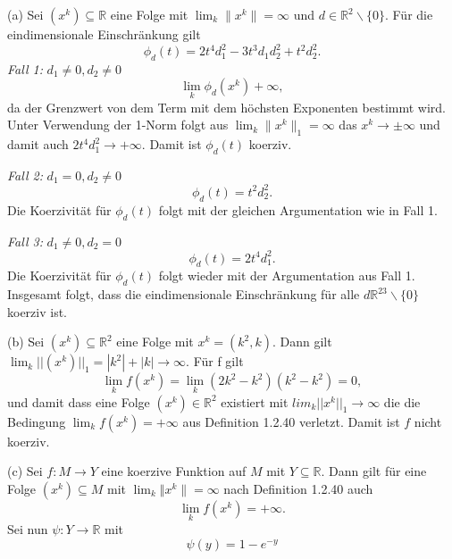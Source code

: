 \documentclass[ngerman, a4paper,12pt]{article}
\begin{document}
(a) Sei $(x^k) \subseteq \mathbb{R}$ eine Folge mit $\lim_k \| x^k \| = \infty$ und $d \in \mathbb{R}^2 \backslash \{0\}$. Für die eindimensionale Einschränkung gilt 
\begin{equation*}
	\phi_d(t) = 2t^4d_1^2 - 3t^3d_1d_2^2 + t^2 d_2^2.
\end{equation*}
\textit{Fall 1:} $d_1 \neq 0, d_2 \neq 0$
\begin{equation}
	\lim\limits_{k} \phi_d(x^k) + \infty,
\end{equation}
da der Grenzwert von dem Term mit dem höchsten Exponenten bestimmt wird. Unter Verwendung der 1-Norm folgt aus $\lim_k \| x^k \|_1 = \infty$ das $x^k \rightarrow \pm \infty$ und damit auch $2t^4d_1^2 \rightarrow + \infty$. Damit ist $\phi_d(t)$ koerziv. \par
\textit{Fall 2:} $d_1 = 0, d_2 \neq 0$
\begin{equation}
	\phi_d(t) = t^2d_2^2.
\end{equation}
Die Koerzivität für $\phi_d(t)$ folgt mit der gleichen Argumentation wie in Fall 1. \par
\textit{Fall 3:} $d_1 \neq 0, d_2 = 0$
\begin{equation}
	\phi_d(t) = 2t^4d_1^2.
\end{equation}
Die Koerzivität für $\phi_d(t)$ folgt wieder mit der Argumentation aus Fall 1. Insgesamt folgt, dass die eindimensionale Einschränkung für alle $d \mathbb{R}^23 \backslash \{0\}$ koerziv ist.
\par
(b) Sei $(x^k) \subseteq \mathbb{R}^2$ eine Folge mit $x^k = (k^2, k)$. Dann gilt $\lim_k ||(x^k)||_1 = |k^2|+|k| \rightarrow \infty$. Für f gilt
\begin{equation}
	\lim\limits_{k} f(x^k) = \lim\limits_{k} (2k^2-k^2)(k^2-k^2) = 0,
\end{equation}
und damit dass eine Folge $(x^k) \in \mathbb{R}^2$ existiert mit $lim_k ||x^k||_1 \rightarrow \infty$ die die Bedingung $\lim_k f(x^k) = + \infty$ aus Definition 1.2.40 verletzt. Damit ist $f$ nicht koerziv. \par
(c) Sei $f: M \rightarrow Y$ eine koerzive Funktion auf $M$ mit $Y \subseteq \mathbb{R}$. Dann gilt für eine Folge $(x^k) \subseteq M$ mit $\lim_{k} \Vert x^k \| = \infty$ nach Definition 1.2.40 auch
\begin{equation*}
\lim\limits_{k} f(x^k) = + \infty .
\end{equation*}
Sei nun $\psi : Y \rightarrow \mathbb{R}$  mit
\begin{equation*}
\psi (y) = 1- e^{-y}
\end{equation*}
\end{document}
